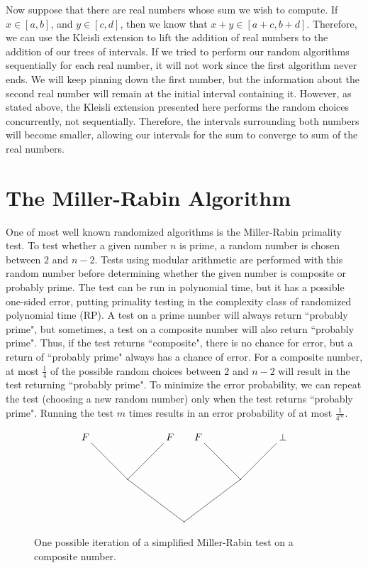 Now suppose that there are real numbers whose sum we wish to compute.  If $x\in [a,b]$, and $y\in [c,d]$, then we know that $x+y \in [a+c,b+d]$.  Therefore, we can use the Kleisli extension to lift the addition of real numbers to the addition of our trees of intervals.  If we tried to perform our random algorithms sequentially for each real number, it will not work since the first algorithm never ends.  We will keep pinning down the first number, but the information about the second real number will remain at the initial interval containing it.  However, as stated above, the Kleisli extension presented here performs the random choices concurrently, not sequentially.  Therefore, the intervals surrounding both numbers will become smaller, allowing our intervals for the sum to converge to sum of the real numbers.

\section{The Miller-Rabin Algorithm} \label{mr}

One of most well known randomized algorithms is the Miller-Rabin primality test. To test whether a given number $n$ is prime, a random number is chosen between $2$ and $n-2$.  Tests using modular arithmetic are performed with this random number before determining whether the given number is composite or probably prime.  The test can be run in polynomial time, but it has a possible one-sided error, putting primality testing in the complexity class of randomized polynomial time (RP).  A test on a prime number will always return ``probably prime", but sometimes, a test on a composite number will also return ``probably prime".  Thus, if the test returns ``composite", there is no chance for error, but a return of ``probably prime" always has a chance of error.  For a composite number, at most $\frac{1}{4}$ of the possible random choices between $2$ and $n-2$ will result in the test returning ``probably prime".  To minimize the error probability, we can repeat the test (choosing a new random number) only when the test returns ``probably prime". Running the test $m$ times results in an error probability of at most $\frac{1}{4^m}$.
\begin{figure}
\[
\begin{xy}
(0,30)*+{F} = "v4";%
(30,30)*+{F} = "v5";%
(40,30)*+{F} = "v6";%
(70,30)*+{\bot} = "v7";%
(15,15)*{} = "v8";%
(55,15)*{} = "v9";%
(35,0)*{} = "v10";%
{\ar@{-} "v9"; "v6"};%
{\ar@{-} "v9"; "v7"};%
{\ar@{-} "v8"; "v5"};%
{\ar@{-} "v8"; "v4"};%
{\ar@{-} "v10"; "v8"};%
{\ar@{-} "v10"; "v9"};
\end{xy}
\]
\caption{One possible iteration of a simplified Miller-Rabin test on a composite number.}
\label{cointree}
\end{figure}

